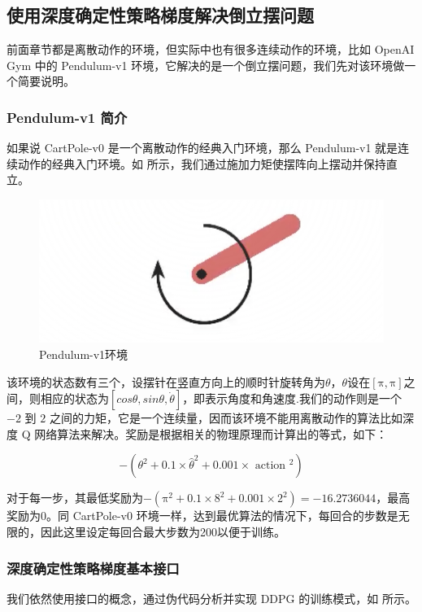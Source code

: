 \subsection{使用深度确定性策略梯度解决倒立摆问题}

前面章节都是离散动作的环境，但实际中也有很多连续动作的环境，比如 OpenAI Gym 中的 Pendulum-v1 环境，它解决的是一个倒立摆问题，我们先对该环境做一个简要说明。

\subsubsection{ Pendulum-v1 简介}

如果说 CartPole-v0 是一个离散动作的经典入门环境，那么 Pendulum-v1 就是连续动作的经典入门环境。如 所示，我们通过施加力矩使摆阵向上摆动并保持直立。

\begin{figure}[htb]
    \centering
    \includegraphics[width=0.3\linewidth]{res/ch12/assets/pendulum_1.png}
    \caption{Pendulum-v1环境}
    \label{fig:pendulum_1}
\end{figure}
该环境的状态数有三个，设摆针在竖直方向上的顺时针旋转角为$\theta$，$\theta$设在$[\mathrm{\pi},\mathrm{\pi}]$之间，则相应的状态为$[cos\theta,sin\theta,\dot{\theta}]$，即表示角度和角速度.我们的动作则是一个 $-2$ 到 $2$ 之间的力矩，它是一个连续量，因而该环境不能用离散动作的算法比如深度 Q 网络算法来解决。奖励是根据相关的物理原理而计算出的等式，如下：

$$
-\left(\theta^{2}+0.1 \times \hat{\theta}^{2}+0.001 \times \text { action }^{2}\right)
$$

对于每一步，其最低奖励为$-\left(\mathrm{\pi}^{2}+0.1 \times 8^{2}+0.001 \times 2^{2}\right)= -16.2736044$，最高奖励为0。同 CartPole-v0 环境一样，达到最优算法的情况下，每回合的步数是无限的，因此这里设定每回合最大步数为200以便于训练。

\subsubsection{ 深度确定性策略梯度基本接口}

我们依然使用接口的概念，通过伪代码分析并实现 DDPG 的训练模式，如 所示。

